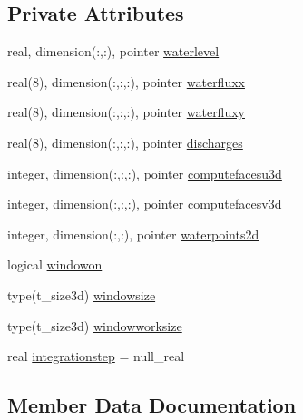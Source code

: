 \subsection*{Private Attributes}
\begin{DoxyCompactItemize}
\item 
real, dimension(\+:,\+:), pointer \mbox{\hyperlink{structmodulehydrodynamicfile_1_1t__stintegration_a15520c6eee46b88f7fec7c41dfc2e7df}{waterlevel}}
\item 
real(8), dimension(\+:,\+:,\+:), pointer \mbox{\hyperlink{structmodulehydrodynamicfile_1_1t__stintegration_abcae520e2fe4b8147409a1677ee54d62}{waterfluxx}}
\item 
real(8), dimension(\+:,\+:,\+:), pointer \mbox{\hyperlink{structmodulehydrodynamicfile_1_1t__stintegration_aa231fa4244e817b2dde132759dc4e401}{waterfluxy}}
\item 
real(8), dimension(\+:,\+:,\+:), pointer \mbox{\hyperlink{structmodulehydrodynamicfile_1_1t__stintegration_a1559256d1a62eff6a1709fa94e0b5ef0}{discharges}}
\item 
integer, dimension(\+:,\+:,\+:), pointer \mbox{\hyperlink{structmodulehydrodynamicfile_1_1t__stintegration_a71b5829fb9c8367bdde2bb673bbba405}{computefacesu3d}}
\item 
integer, dimension(\+:,\+:,\+:), pointer \mbox{\hyperlink{structmodulehydrodynamicfile_1_1t__stintegration_abcbfaa9a5b6061ed6951d20b378eb85d}{computefacesv3d}}
\item 
integer, dimension(\+:,\+:), pointer \mbox{\hyperlink{structmodulehydrodynamicfile_1_1t__stintegration_af76aeb2f2294d771ab29ba5533d72e1a}{waterpoints2d}}
\item 
logical \mbox{\hyperlink{structmodulehydrodynamicfile_1_1t__stintegration_a7699861fb75a77478c1ca1f9c257e3c5}{windowon}}
\item 
type(t\+\_\+size3d) \mbox{\hyperlink{structmodulehydrodynamicfile_1_1t__stintegration_a00371d7fd6d71570acc6ef213703f71f}{windowsize}}
\item 
type(t\+\_\+size3d) \mbox{\hyperlink{structmodulehydrodynamicfile_1_1t__stintegration_ae223f8d40d0e00f639c2e88ad0840c4c}{windowworksize}}
\item 
real \mbox{\hyperlink{structmodulehydrodynamicfile_1_1t__stintegration_a6bc4cc1570d98b21faa2518f9d99c81b}{integrationstep}} = null\+\_\+real
\end{DoxyCompactItemize}


\subsection{Member Data Documentation}
\mbox{\label{structmodulehydrodynamicfile_1_1t__stintegration_a71b5829fb9c8367bdde2bb673bbba405}} 
